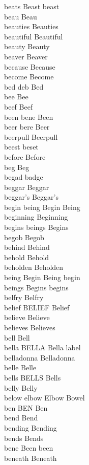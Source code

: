 beats Beast beast\\
beau Beau\\
beauties Beauties\\
beautiful Beautiful\\
beauty Beauty\\
beaver Beaver\\
because Because\\
become Become\\
bed deb Bed\\
bee Bee\\
beef Beef\\
been bene Been\\
beer bere Beer\\
beerpull Beerpull\\
beest beset\\
before Before\\
beg Beg\\
begad badge\\
beggar Beggar\\
beggar's Beggar's\\
begin being Begin Being\\
beginning Beginning\\
begins beings Begins\\
begob Begob\\
behind Behind\\
behold Behold\\
beholden Beholden\\
being Begin Being begin\\
beings Begins begins\\
belfry Belfry\\
belief BELIEF Belief\\
believe Believe\\
believes Believes\\
bell Bell\\
bella BELLA Bella label\\
belladonna Belladonna\\
belle Belle\\
bells BELLS Bells\\
belly Belly\\
below elbow Elbow Bowel\\
ben BEN Ben\\
bend Bend\\
bending Bending\\
bends Bends\\
bene Been been\\
beneath Beneath\\
